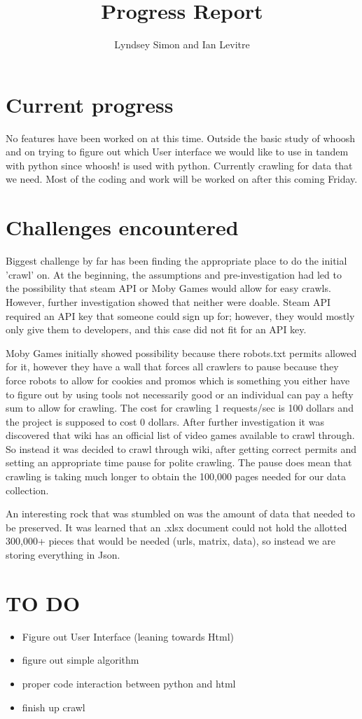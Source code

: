 \documentclass{article}
\title{Progress Report}
\author{Lyndsey Simon and Ian Levitre}
\begin{document}
\maketitle

\section{Current progress}

\quad No features have been worked on at this time. Outside the basic study of whoosh and on trying to figure out which User interface we would like to use in tandem with python since whoosh! is used with python. Currently crawling for data that we need. Most of the coding and work will be worked on after this coming Friday.

\section{Challenges encountered}

\quad Biggest challenge by far has been finding the appropriate place to do the initial 'crawl' on. At the beginning, the assumptions and pre-investigation had led to the possibility that steam API or Moby Games would allow for easy crawls. However, further investigation showed that neither were doable. Steam API required an API key that someone could sign up for; however, they would mostly only give them to developers, and this case did not fit for an API key. 

Moby Games initially showed possibility because there robots.txt permits allowed for it, however they have a wall that forces all crawlers to pause because they force robots to allow for cookies and promos which is something you either have to figure out by using tools not necessarily good or an individual can pay a hefty sum to allow for crawling. The cost for crawling 1 requests/sec is 100 dollars and the project is supposed to cost 0 dollars. After further investigation it was discovered that wiki has an official list of video games available to crawl through. So instead it was decided to crawl through wiki, after getting correct permits and setting an appropriate time pause for polite crawling. The pause does mean that crawling is taking much longer to obtain the 100,000 pages needed for our data collection.

An interesting rock that was stumbled on was the amount of data that needed to be preserved. It was learned that an .xlsx document could not hold the allotted 300,000+ pieces that would be needed (urls, matrix, data), so instead we are storing everything in Json. 
    
\section{TO DO}

\begin{itemize}
\item Figure out User Interface (leaning towards Html)
\item figure out simple algorithm
\item proper code interaction between python and html
\item finish up crawl
\end{itemize}
\end{document}
